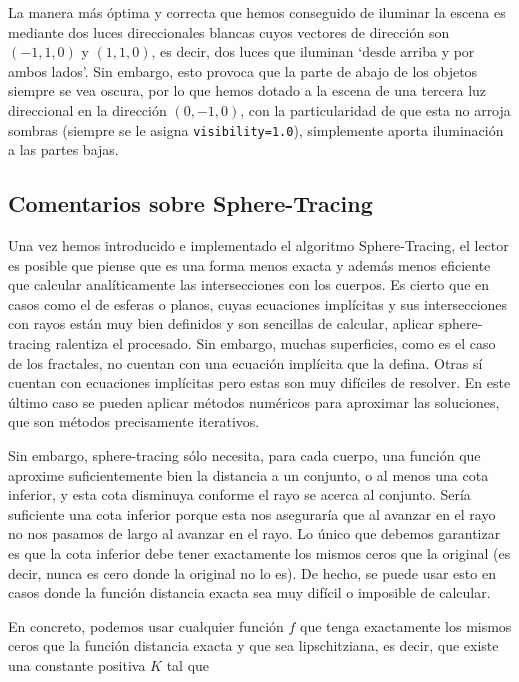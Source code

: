 La manera más óptima y correcta que hemos conseguido de iluminar la escena es mediante dos luces direccionales blancas cuyos vectores de dirección son $(-1,1,0)$ y $(1,1,0)$, es decir, dos luces que iluminan `desde arriba y por ambos lados'. Sin embargo, esto provoca que la parte de abajo de los objetos siempre se vea oscura, por lo que hemos dotado a la escena de una tercera luz direccional en la dirección $(0,-1,0)$, con la particularidad de que esta no arroja sombras (siempre se le asigna \verb|visibility=1.0|), simplemente aporta iluminación a las partes bajas.

\subsection{Comentarios sobre Sphere-Tracing}
\label{subsection:comentarios}

Una vez hemos introducido e implementado el algoritmo Sphere-Tracing, el lector es posible que piense que es una forma menos exacta y además menos eficiente que calcular analíticamente las intersecciones con los cuerpos. Es cierto que en casos como el de esferas o planos, cuyas ecuaciones implícitas y sus intersecciones con rayos están muy bien definidos y son sencillas de calcular, aplicar sphere-tracing ralentiza el procesado. Sin embargo, muchas superficies, como es el caso de los fractales, no cuentan con una ecuación implícita que la defina. Otras sí cuentan con ecuaciones implícitas pero estas son muy difíciles de resolver. En este último caso se pueden aplicar métodos numéricos para aproximar las soluciones, que son métodos precisamente iterativos. 

Sin embargo, sphere-tracing sólo necesita, para cada cuerpo, una función que aproxime suficientemente bien la distancia a un conjunto, o al menos una cota inferior, y esta cota disminuya conforme el rayo se acerca al conjunto. Sería suficiente una cota inferior porque esta nos aseguraría que al avanzar en el rayo no nos pasamos de largo al avanzar en el rayo. Lo único que debemos garantizar es que la cota inferior debe tener exactamente los mismos ceros que la original (es decir, nunca es cero donde la original no lo es). De hecho, se puede usar esto en casos donde la función distancia exacta sea muy difícil o imposible de calcular.

En concreto, podemos usar cualquier función $f$ que tenga exactamente los mismos ceros que la función distancia exacta y que sea lipschitziana, es decir, que existe una constante positiva $K$ tal que

